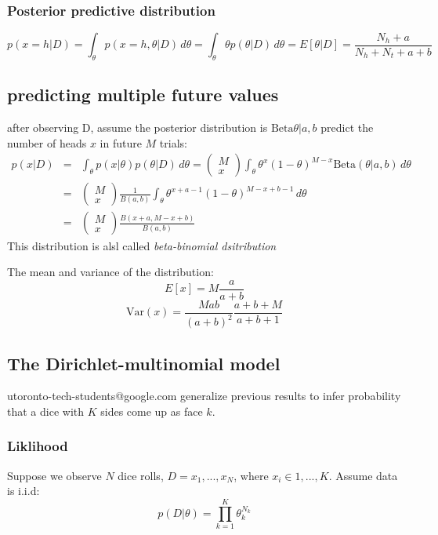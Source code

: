 \documentclass[11pt]{article}
\begin{document}
\subsubsection{Posterior predictive distribution}
\[
p(x=h|D) = \int_\theta p(x=h,\theta|D)\,d\theta = \int_\theta \theta p(\theta|D)\,d\theta = E[\theta|D] = \frac{N_h+a}{N_h+N_t+a+b}
\]

\subsection{predicting multiple future values}
after observing D, assume the posterior distribution is $\mathrm{Beta}{\theta|a,b}$ predict the number of heads $x$ in future $M$ trials:
\begin{eqnarray*}
p(x|D) &=& \int_\theta p(x|\theta)p(\theta|D)\,d\theta = \left(\begin{array}{c}
M\\
x
\end{array}\right) \int_\theta \theta^x (1-\theta)^{M-x}\mathrm{Beta}(\theta|a,b)\, d\theta  \\
&=& 
\left(\begin{array}{c}
M\\
x
\end{array}\right) \frac{1}{B(a,b)}\int_\theta \theta^{x+a-1}(1-\theta)^{M-x+b-1}\,d\theta \\
&=& \left(\begin{array}{c}
M \\
x
\end{array}\right)\frac{B(x+a,M-x+b)}{B(a,b)}
\end{eqnarray*}
This distribution is alsl called \emph{beta-binomial dsitribution}

The mean and variance of the distribution:
\[
E[x] = M\frac{a}{a+b}
\]
\[
\mathrm{Var}(x) = \frac{Mab}{(a+b)^2}\frac{a+b+M}{a+b+1}
\]

\subsection{The Dirichlet-multinomial model}
utoronto-tech-students@google.com
generalize previous results to infer probability that a dice with $K$ sides come up as face $k$.
\subsubsection{Liklihood}
Suppose we observe $N$ dice rolls, $D={x_1,...,x_N}$, where $x_i \in {1,...,K}.$ Assume data is i.i.d:
\[
p(D|\theta)=\prod_{k=1}^{K}\theta_k^{N_k}
\]
\end{document}
